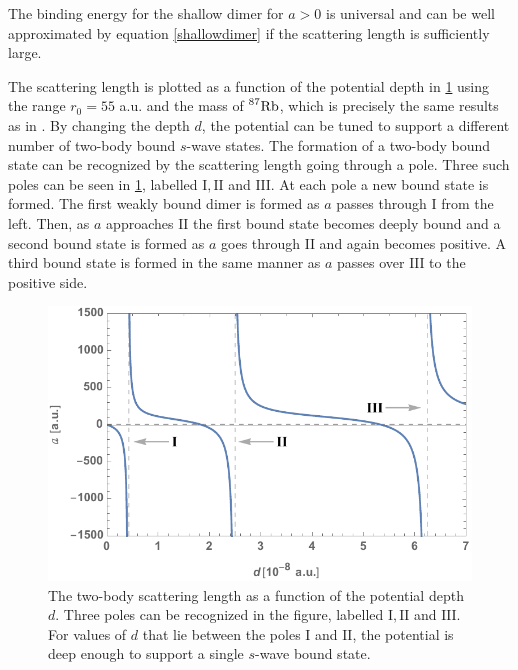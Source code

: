 The binding energy for the shallow dimer for $a>0$ is universal and can be well approximated by equation \eqref{shallowdimer} if the scattering length is sufficiently large.

The scattering length is plotted as a function of the potential depth in \cref{fig:res_1} using the range $r_0=55 $ a.u. and the mass of $ \prescript{87}{}{\mathrm{Rb}}$, which is precisely the same results as in \cite{Blume2002}. By changing the depth $d$, the potential can be tuned to support a different number of two-body bound $s$-wave states. The formation of a two-body bound state can be recognized by the scattering length going through a pole. Three such poles can be seen in \cref{fig:res_1}, labelled $\mathrm{I},\mathrm{II}$ and $\mathrm{III}$. At each pole a new bound state is formed. The first weakly bound dimer is formed as $a$ passes through $\mathrm{I}$ from the left. Then, as $a$ approaches $\mathrm{II}$ the first bound state becomes deeply bound and a second bound state is formed as $a$ goes through $\mathrm{II}$ and again becomes positive. A third bound state is formed in the same manner as $a$ passes over $\mathrm{III}$ to the positive side.

\begin{figure}[b!]
	\includegraphics[width=\linewidth]{scattering_new.pdf}
	\caption{The two-body scattering length as a function of the potential depth $d$. Three poles can be recognized in the figure, labelled $\mathrm{I},\mathrm{II}$ and $\mathrm{III}$. For values of $d$ that lie between the poles $\mathrm{I}$ and $\mathrm{II}$, the potential is deep enough to support a single $s$-wave bound state.}
	\label{fig:res_1}
\end{figure}